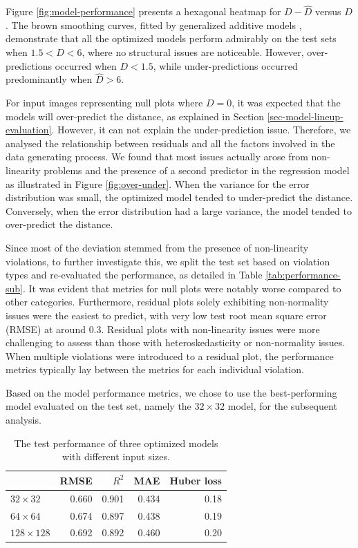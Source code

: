 \documentclass[]{interact}
\theoremstyle{plain}%
\theoremstyle{definition}
\theoremstyle{remark}
\begin{document}
Figure \ref{fig:model-performance} presents a hexagonal heatmap for
\(D - \hat{D}\) versus \(D\). The brown smoothing curves, fitted by
generalized additive models \citep{hastie2017generalized}, demonstrate
that all the optimized models perform admirably on the test sets when
\(1.5 < D < 6\), where no structural issues are noticeable. However,
over-predictions occurred when \(D < 1.5\), while under-predictions
occurred predominantly when \(\hat{D} > 6\).

For input images representing null plots where \(D = 0\), it was
expected that the models will over-predict the distance, as explained in
Section \ref{sec-model-lineup-evaluation}. However, it can not explain
the under-prediction issue. Therefore, we analysed the relationship
between residuals and all the factors involved in the data generating
process. We found that most issues actually arose from non-linearity
problems and the presence of a second predictor in the regression model
as illustrated in Figure \ref{fig:over-under}. When the variance for the
error distribution was small, the optimized model tended to
under-predict the distance. Conversely, when the error distribution had
a large variance, the model tended to over-predict the distance.

Since most of the deviation stemmed from the presence of non-linearity
violations, to further investigate this, we split the test set based on
violation types and re-evaluated the performance, as detailed in Table
\ref{tab:performance-sub}. It was evident that metrics for null plots
were notably worse compared to other categories. Furthermore, residual
plots solely exhibiting non-normality issues were the easiest to
predict, with very low test root mean square error (RMSE) at around
\(0.3\). Residual plots with non-linearity issues were more challenging
to assess than those with heteroskedasticity or non-normality issues.
When multiple violations were introduced to a residual plot, the
performance metrics typically lay between the metrics for each
individual violation.

Based on the model performance metrics, we chose to use the
best-performing model evaluated on the test set, namely the
\(32 \times 32\) model, for the subsequent analysis.

\begin{table}

\caption{\label{tab:performance}The test performance of three optimized models with different input sizes.}
\centering
\begin{tabular}[t]{lrrrr}
\toprule
 & RMSE & $R^2$ & MAE & Huber loss\\
\midrule
$32 \times 32$ & 0.660 & 0.901 & 0.434 & 0.18\\
$64 \times 64$ & 0.674 & 0.897 & 0.438 & 0.19\\
$128 \times 128$ & 0.692 & 0.892 & 0.460 & 0.20\\
\bottomrule
\end{tabular}
\end{table}
\end{document}
